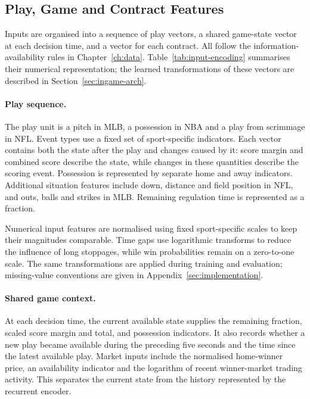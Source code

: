 \documentclass[12pt,a4paper,oneside]{report}
\begin{document}
\subsection{Play, Game and Contract Features}
Inputs are organised into a sequence of play vectors, a shared game-state
vector at each decision time, and a vector for each contract. All follow the
information-availability rules in Chapter~\ref{ch:data}. Table~\ref{tab:input-encoding}
summarises their numerical representation; the learned transformations of these
vectors are described in Section~\ref{sec:ingame-arch}.

\paragraph{Play sequence.}
The play unit is a pitch in MLB, a possession in NBA and a play from scrimmage
in NFL. Event types use a fixed set of sport-specific indicators. Each vector
contains both the state after the
play and changes caused by it: score margin and combined score describe the
state, while changes in these quantities describe the scoring event. Possession
is represented by separate home and away indicators. Additional situation
features include down, distance and field position in NFL, and outs, balls and
strikes in MLB. Remaining regulation time is represented as a fraction.

Numerical input features are normalised using fixed sport-specific scales to
keep their magnitudes comparable. Time gaps use logarithmic transforms to
reduce the influence of long stoppages, while win probabilities remain on a
zero-to-one scale. The same transformations are applied during training and
evaluation; missing-value conventions are given in
Appendix~\ref{sec:implementation}.

\paragraph{Shared game context.}
At each decision time, the current available state supplies the remaining
fraction, scaled score margin and total, and possession indicators. It also
records whether a new play became available during the preceding five seconds
and the time since the latest available play. Market inputs include the
normalised home-winner price, an availability indicator and the logarithm
of recent winner-market trading activity. This separates the current state
from the history represented by the recurrent encoder.
\end{document}
